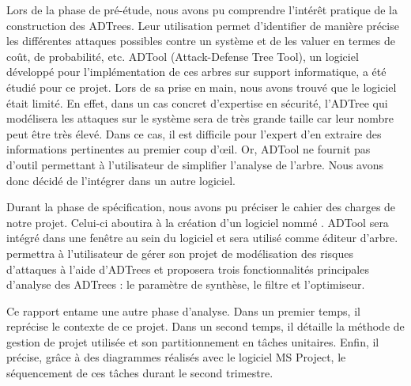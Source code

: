 Lors de la phase de pré-étude, nous avons pu comprendre l’intérêt pratique de la construction des ADTrees. Leur utilisation permet d'identifier de manière précise les différentes attaques possibles contre un système et de les valuer en termes de coût, de probabilité, etc. ADTool (Attack-Defense Tree Tool), un logiciel développé pour l'implémentation de ces arbres sur support informatique, a été étudié pour ce projet. Lors de sa prise en main, nous avons trouvé que le logiciel était limité. En effet, dans un cas concret d'expertise en sécurité, l'ADTree qui modélisera les attaques sur le système sera de très grande taille car leur nombre peut être très élevé. Dans ce cas, il est difficile pour l'expert d'en extraire des informations pertinentes au premier coup d’œil. Or, ADTool ne fournit pas d'outil permettant à l'utilisateur de simplifier l'analyse de l'arbre. Nous avons donc décidé de l'intégrer dans un autre logiciel.

Durant la phase de spécification, nous avons pu préciser le cahier des charges de notre projet. Celui-ci aboutira à la création d'un logiciel nommé \glasir{}. ADTool sera intégré dans une fenêtre au sein du logiciel et sera utilisé comme éditeur d'arbre. \glasir{} permettra à l'utilisateur de gérer son projet de modélisation des risques d'attaques à l'aide d'ADTrees et proposera trois fonctionnalités principales d'analyse des ADTrees : le paramètre de synthèse, le filtre et l'optimiseur.

Ce rapport entame une autre phase d'analyse. Dans un premier temps, il reprécise le contexte de ce projet. Dans un second temps, il détaille la méthode de gestion de projet utilisée et son partitionnement en tâches unitaires. Enfin, il précise, grâce à des diagrammes réalisés avec le logiciel MS Project, le séquencement de ces tâches durant le second trimestre.